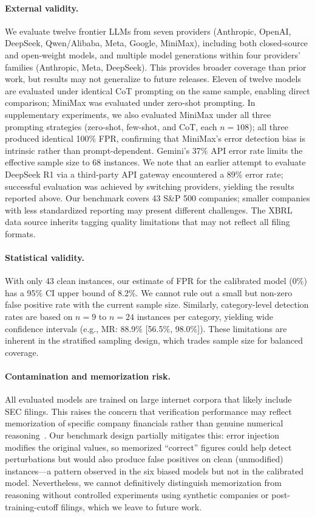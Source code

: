 \documentclass[11pt]{article}
\begin{document}
\paragraph{External validity.}
We evaluate twelve frontier LLMs from seven providers (Anthropic, OpenAI, DeepSeek, Qwen/Alibaba, Meta, Google, MiniMax), including both closed-source and open-weight models, and multiple model generations within four providers' families (Anthropic, Meta, DeepSeek).
This provides broader coverage than prior work, but results may not generalize to future releases.
Eleven of twelve models are evaluated under identical CoT prompting on the same sample, enabling direct comparison; MiniMax was evaluated under zero-shot prompting.
In supplementary experiments, we also evaluated MiniMax under all three prompting strategies (zero-shot, few-shot, and CoT, each $n=108$); all three produced identical 100\% FPR, confirming that MiniMax's error detection bias is intrinsic rather than prompt-dependent.
Gemini's 37\% API error rate limits the effective sample size to 68 instances.
We note that an earlier attempt to evaluate DeepSeek R1 via a third-party API gateway encountered a 89\% error rate; successful evaluation was achieved by switching providers, yielding the results reported above.
Our benchmark covers 43 S\&P 500 companies; smaller companies with less standardized reporting may present different challenges.
The XBRL data source inherits tagging quality limitations that may not reflect all filing formats.

\paragraph{Statistical validity.}
With only 43 clean instances, our estimate of FPR for the calibrated model (0\%) has a 95\% CI upper bound of 8.2\%.
We cannot rule out a small but non-zero false positive rate with the current sample size.
Similarly, category-level detection rates are based on $n=9$ to $n=24$ instances per category, yielding wide confidence intervals (e.g., MR: 88.9\% [56.5\%, 98.0\%]).
These limitations are inherent in the stratified sampling design, which trades sample size for balanced coverage.

\paragraph{Contamination and memorization risk.}
All evaluated models are trained on large internet corpora that likely include SEC filings.
This raises the concern that verification performance may reflect memorization of specific company financials rather than genuine numerical reasoning~\citep{memorization2025}.
Our benchmark design partially mitigates this: error injection modifies the original values, so memorized ``correct'' figures could help detect perturbations but would also produce false positives on clean (unmodified) instances---a pattern observed in the six biased models but not in the calibrated model.
Nevertheless, we cannot definitively distinguish memorization from reasoning without controlled experiments using synthetic companies or post-training-cutoff filings, which we leave to future work.
\end{document}
